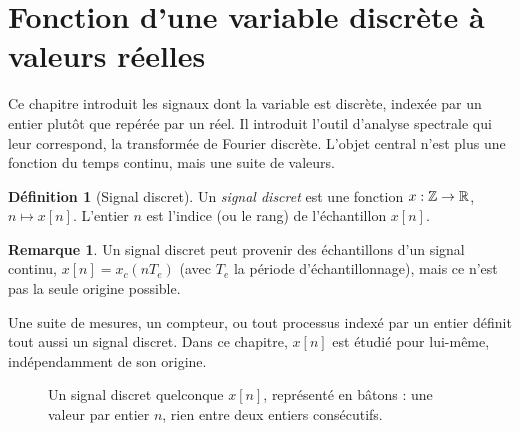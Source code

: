 \documentclass[a4paper,11pt]{article}
\title{\chapterTitle}
\author{}
\date{}
\makeatletter
\renewcommand\maketitle{{\raggedright\begin{center}
    {\Huge\bfseries\@title}
\end{center}}}
\theoremstyle{definition}
\newtheorem{definition}{Définition}[section]
\newtheorem{remark}{Remarque}[section]
\newcommand{\highlight}[1]{{\color{niceblue}\emph{#1}}}
\makeatother
\begin{document}
\selectfont
\fontsize{12pt}{14pt}\selectfont

\maketitle
\thispagestyle{fancy}

\section{Fonction d'une variable discrète à valeurs réelles}

Ce chapitre introduit les signaux dont la variable est discrète, 
indexée par un entier plutôt que repérée par un réel. Il introduit l'outil d'analyse spectrale qui
leur correspond, la transformée de Fourier discrète. L'objet central
n'est plus une fonction du temps continu, mais une suite de valeurs.

\begin{definition}[Signal discret]
    Un \highlight{signal discret} est une fonction $x:{\mathbb{Z}}\to{\mathbb{R}}$,
    $n\mapsto x[n]$. L'entier $n$ est l'indice (ou le rang) de
    l'échantillon $x[n]$.
\end{definition}

\begin{remark}
    Un signal discret peut provenir des échantillons d'un signal
    continu, $x[n] = x_c(nT_e)$ (avec $T_e$ la période d'échantillonnage),
    mais ce n'est pas la seule origine possible.
    
    Une suite de mesures, un compteur, ou tout processus indexé par un entier définit tout
    aussi un signal discret. Dans ce chapitre, $x[n]$ est étudié
    pour lui-même, indépendamment de son origine.
\end{remark}

\begin{figure}[h]
    \centering
    \caption{Un signal discret quelconque $x[n]$, représenté en bâtons : une valeur par entier $n$, rien entre deux entiers consécutifs.}
    \label{fig:signal-discret}
\end{figure}
\end{document}
